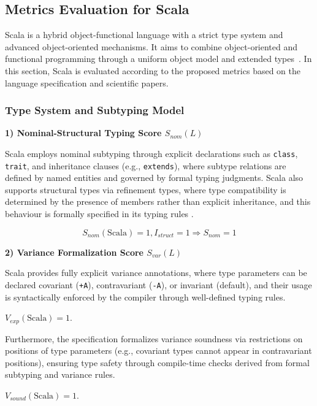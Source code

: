 
\subsection{Metrics Evaluation for Scala}

Scala is a hybrid object-functional language with a strict type system and advanced object-oriented mechanisms.
It aims to combine object-oriented and functional programming through a uniform object model and extended types~\cite{odersky2004overview, emir2007matching}.
In this section, Scala is evaluated according to the proposed metrics based on the language specification and scientific papers.

\subsubsection{Type System and Subtyping Model}

\textbf{1) Nominal-Structural Typing Score $S_{nom}(L)$}

Scala employs nominal subtyping through explicit declarations such as \texttt{class}, \texttt{trait}, and inheritance clauses (e.g., \texttt{extends}), where subtype relations are defined by named entities and governed by formal typing judgments. 
Scala also supports structural types via refinement types, where type compatibility is determined by the presence of members rather than explicit inheritance, and this behaviour is formally specified in its typing rules \cite{odersky2004overview}. 

\[
    S_{nom}(\text{Scala}) = 1, I_{struct} = 1 \Rightarrow S_{nom} = 1
\]

\textbf{2) Variance Formalization Score $S_{var}(L)$}

Scala provides fully explicit variance annotations, where type parameters can be declared covariant (\texttt{+A}), contravariant (\texttt{-A}), or invariant (default), and their usage is syntactically enforced by the compiler through well-defined typing rules.

$V_{exp}(\text{Scala}) = 1$. 

Furthermore, the specification formalizes variance soundness via restrictions on positions of type parameters (e.g., covariant types cannot appear in contravariant positions), ensuring type safety through compile-time checks derived from formal subtyping and variance rules.

$V_{sound}(\text{Scala}) = 1$.

